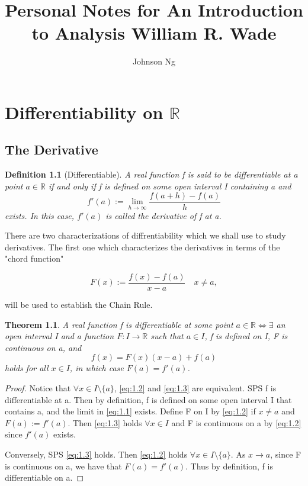 \documentclass[11pt, oneside]{book}
\title{Personal Notes for An Introduction to Analysis William R. Wade}
\author{Johnson Ng}
\theoremstyle{break}
\newtheorem{thm}{Theorem}[section]
\newtheorem*{proof}{Proof}
\newtheorem{defn}{Definition}[section]
\newcommand{\bb}[1]{\mathbb{#1}}			%
\begin{document}
\maketitle

\tableofcontents

\chapter{Differentiability on \texorpdfstring{$\bb{R}$}{R}}

\section{The Derivative}

\begin{defn}[Differentiable]
    A real function f is said to be differentiable at a point $a \in \bb{R}$ if and only if f is defined on some open interval I containing a and
    \begin{equation}\label{eq:1.1}
        f'(a) := \lim_{h \to \infty} \frac{f(a+h) - f(a)}{h}
    \end{equation}
    exists. In this case, $f'(a)$ is called the derivative of f at a.
\end{defn}

There are two characterizations of diffrentiability which we shall use to study derivatives. The first one which characterizes the derivatives in terms of the "chord function"

\begin{equation}\label{eq:1.2}
    F(x) := \frac{f(x) - f(a)}{x-a} \quad x \neq a,
\end{equation}

will be used to establish the Chain Rule.

\begin{thm}
    A real function f is differentiable at some point $a \in \bb{R} \iff \exists$ an open interval I and a function $F: I \to \bb{R}$ such that $a \in I$, f is defined on I, F is continuous on a, and
    \begin{equation}\label{eq:1.3}
        f(x) = F(x)(x-a) + f(a)
    \end{equation}
    holds for all $x \in I$, in which case $F(a) = f'(a)$.
\end{thm}

\begin{proof}
    Notice that $\forall x \in I \setminus \{a\}$, \ref{eq:1.2} and \ref{eq:1.3} are equivalent. SPS f is differentiable at a. Then by definition, f is defined on some open interval I that contains a, and the limit in \ref{eq:1.1} exists. Define F on I by \ref{eq:1.2} if $x \neq a$ and $F(a) := f'(a)$. Then \ref{eq:1.3} holds $\forall x \in I$ and F is continuous on a by \ref{eq:1.2} since $f'(a)$ exists.

    Conversely, SPS \ref{eq:1.3} holds. Then \ref{eq:1.2} holds $\forall x \in I \setminus \{a\}$. As $x \to a$, since F is continuous on a, we have that $F(a) = f'(a)$. Thus by definition, f is differentiable on a.
\end{proof}
\end{document}
